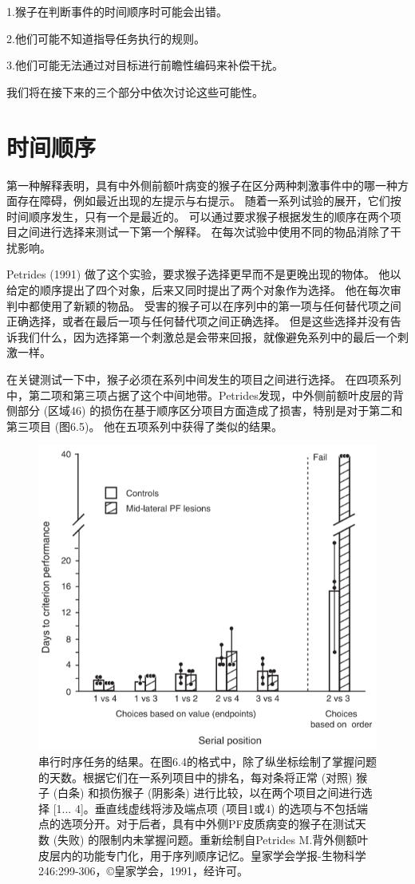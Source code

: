 1.猴子在判断事件的时间顺序时可能会出错。
\par

2.他们可能不知道指导任务执行的规则。
\par

3.他们可能无法通过对目标进行前瞻性编码来补偿干扰。

我们将在接下来的三个部分中依次讨论这些可能性。



\section{时间顺序}

第一种解释表明，具有中外侧前额叶病变的猴子在区分两种刺激事件中的哪一种方面存在障碍，例如最近出现的左提示与右提示。
随着一系列试验的展开，它们按时间顺序发生，只有一个是最近的。
可以通过要求猴子根据发生的顺序在两个项目之间进行选择来测试一下第一个解释。
在每次试验中使用不同的物品消除了干扰影响。


Petrides (1991) 做了这个实验，要求猴子选择更早而不是更晚出现的物体。
他以给定的顺序提出了四个对象，后来又同时提出了两个对象作为选择。
他在每次审判中都使用了新颖的物品。
受害的猴子可以在序列中的第一项与任何替代项之间正确选择，或者在最后一项与任何替代项之间正确选择。
但是这些选择并没有告诉我们什么，因为选择第一个刺激总是会带来回报，就像避免系列中的最后一个刺激一样。


在关键测试一下中，猴子必须在系列中间发生的项目之间进行选择。
在四项系列中，第二项和第三项占据了这个中间地带。Petrides发现，中外侧前额叶皮层的背侧部分 (区域46) 的损伤在基于顺序区分项目方面造成了损害，特别是对于第二和第三项目 (图6.5)。
他在五项系列中获得了类似的结果。


\begin{figure}
	\centering
	\includegraphics[width=0.5\linewidth]{image_pfc/Fig_6_5}
	\caption{串行时序任务的结果。在图6.4的格式中，除了纵坐标绘制了掌握问题的天数。根据它们在一系列项目中的排名，每对条将正常 (对照) 猴子 (白条) 和损伤猴子 (阴影条) 进行比较，以在两个项目之间进行选择 [1... 4]。垂直线虚线将涉及端点项 (项目1或4) 的选项与不包括端点的选项分开。对于后者，具有中外侧PF皮质病变的猴子在测试天数 (失败) 的限制内未掌握问题。重新绘制自Petrides M.背外侧额叶皮层内的功能专门化，用于序列顺序记忆。皇家学会学报-生物科学246:299-306，©皇家学会，1991，经许可。}
	\label{fig:fig}
\end{figure}


